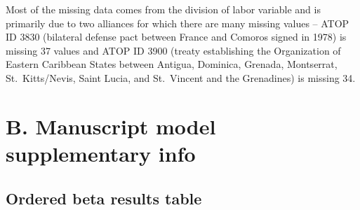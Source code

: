 \documentclass[
  letterpaper,
  DIV=11,
  numbers=noendperiod]{scrartcl}
\begin{document}
Most of the missing data comes from the division of labor variable and
is primarily due to two alliances for which there are many missing
values -- ATOP ID 3830 (bilateral defense pact between France and
Comoros signed in 1978) is missing 37 values and ATOP ID 3900 (treaty
establishing the Organization of Eastern Caribbean States between
Antigua, Dominica, Grenada, Montserrat, St.~Kitts/Nevis, Saint Lucia,
and St.~Vincent and the Grenadines) is missing 34.

\newpage

\section{B. Manuscript model supplementary
info}\label{b.-manuscript-model-supplementary-info}

\subsection{Ordered beta results
table}\label{ordered-beta-results-table}
\end{document}
